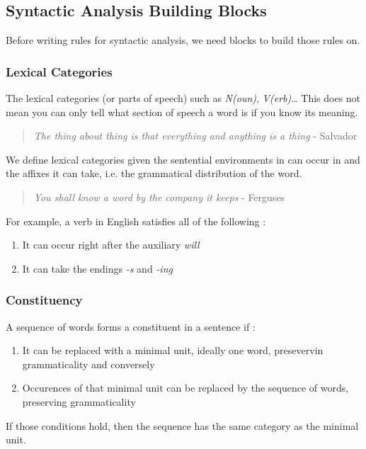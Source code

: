 \documentclass{cours}
\begin{document}
\subsection{Syntactic Analysis Building Blocks}
Before writing rules for syntactic analysis, we need blocks to build those rules on.

\subsubsection{Lexical Categories}
The lexical categories (or parts of speech) such as \textsl{N(oun)}, \textsl{V(erb)}\dots 
This does not mean you can only tell what section of speech a word is if you know its meaning.\\
\begin{quotation}
    \textit{The thing about thing is that everything and anything is a thing} - Salvador
\end{quotation}

\begin{definition}
    We define lexical categories given the sentential environments in can occur in and the affixes it can take, i.e. the grammatical distribution of the word.
\end{definition}
\begin{quotation}
    \textit{You shall know a word by the company it keeps} - Ferguses
\end{quotation}
For example, a verb in English satisfies all of the following\! :
\begin{enumerate}
    \item It can occur right after the auxiliary \textsl{will}
    \item It can take the endings \textsl{-s} and \textsl{-ing}
\end{enumerate}

\subsubsection{Constituency}
\begin{definition}[A Heuristic]
    A sequence of words forms a constituent in a sentence if\! :
    \begin{enumerate}
        \item It can be replaced with a minimal unit, ideally one word, presevervin grammaticality and conversely
        \item Occurences of that minimal unit can be replaced by the sequence of words, preserving grammaticality
    \end{enumerate}
    If those conditions hold, then the sequence has the same category as the minimal unit. 
\end{definition}
\end{document}
